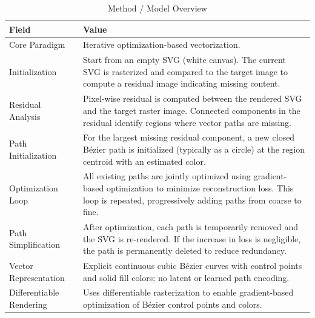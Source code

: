 \begin{table}[h!]
\centering
\caption{Method / Model Overview}
\begin{tabular}{|l|p{10cm}|}
\hline
\textbf{Field} & \textbf{Value} \\ \hline

Core Paradigm &
Iterative optimization-based vectorization. \\ \hline

Initialization &
Start from an empty SVG (white canvas). The current SVG is rasterized and compared to the target image to compute a residual image indicating missing content. \\ \hline

Residual Analysis &
Pixel-wise residual is computed between the rendered SVG and the target raster image. Connected components in the residual identify regions where vector paths are missing. \\ \hline

Path Initialization &
For the largest missing residual component, a new closed Bézier path is initialized (typically as a circle) at the region centroid with an estimated color. \\ \hline

Optimization Loop &
All existing paths are jointly optimized using gradient-based optimization to minimize reconstruction loss. This loop is repeated, progressively adding paths from coarse to fine. \\ \hline

Path Simplification &
After optimization, each path is temporarily removed and the SVG is re-rendered. If the increase in loss is negligible, the path is permanently deleted to reduce redundancy. \\ \hline

Vector Representation &
Explicit continuous cubic Bézier curves with control points and solid fill colors; no latent or learned path encoding. \\ \hline

Differentiable Rendering &
Uses differentiable rasterization to enable gradient-based optimization of Bézier control points and colors. \\ \hline

\end{tabular}
\end{table}

